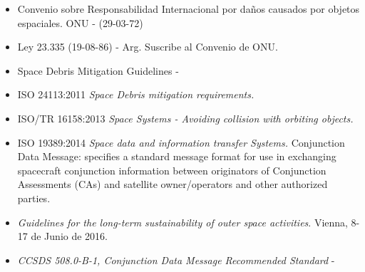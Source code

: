 \begin{itemize} 
\item Convenio sobre Responsabilidad Internacional por da\~nos causados por objetos espaciales. ONU - (29-03-72)
\item Ley 23.335 (19-08-86) - Arg. Suscribe al Convenio de ONU.
\item Space Debris Mitigation Guidelines - \citep{IADC}
\item ISO 24113:2011 {\it{Space Debris mitigation requirements.}}
\item ISO/TR 16158:2013 {\it{Space Systems - Avoiding collision with orbiting objects.}}
\item ISO 19389:2014 {\it{Space data and information transfer Systems.}} Conjunction Data Message: specifies a standard message format for use in exchanging spacecraft conjunction information between originators of Conjunction Assessments (CAs) and satellite owner/operators and other authorized parties.
\item {\it{Guidelines for the long-term sustainability of outer space activities}}. Vienna, 8-17 de Junio de 2016.
\item {\it{CCSDS 508.0-B-1, Conjunction Data Message Recommended Standard}} - \citep{CDM}
\end{itemize}

